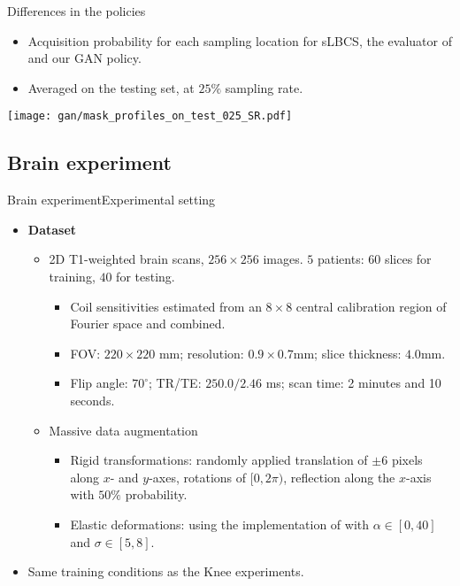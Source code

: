 \begin{frame}{Differences in the policies}
    \begin{itemize}
        \item Acquisition probability for each sampling location for sLBCS, the evaluator of \cite{zhang2019reducing} and our GAN policy.
        \vfill\item Averaged on the testing set, at $25\%$ sampling rate.
    \end{itemize}
    \vfill
    \begin{center}
    \texttt{[image: gan/mask\_profiles\_on\_test\_025\_SR.pdf]}
    \end{center}
\end{frame}

\subsection{Brain experiment}
\begin{frame}{Brain experiment}{Experimental setting}
    \begin{itemize}
        \item \textbf{Dataset}
        \begin{itemize}
            \item 2D T1-weighted brain scans, $256\times 256$ images. $5$ patients: $60$ slices for training, $40$ for testing.
            \begin{itemize}
                \item  Coil sensitivities estimated from an $8\times 8$ central calibration region of Fourier space \parencite{bydder2002combination} and combined.
                \item FOV: $220\times 220$ mm; resolution: $0.9\times 0.7 $mm;  slice thickness: $4.0$mm. 
                \item Flip angle: $70^{\circ}$; TR/TE: $250.0/2.46$ ms; scan time: 2 minutes and 10 seconds.
            \end{itemize}
            \item Massive data augmentation \parencite{ronneberger2015u,schlemper2017deep}
            \begin{itemize}
                \item Rigid transformations: randomly applied translation of $\pm 6$ pixels along $x$- and $y$-axes, rotations of $[0, 2\pi)$, reflection along the $x$-axis with $50\%$ probability.
                \item Elastic deformations: using the implementation of \cite{simard2003best} with $\alpha \in [0, 40]$ and $\sigma \in [5, 8]$. 
            \end{itemize} 
        \end{itemize} 
        \item Same training conditions as the Knee experiments.
    \end{itemize}
\end{frame}

